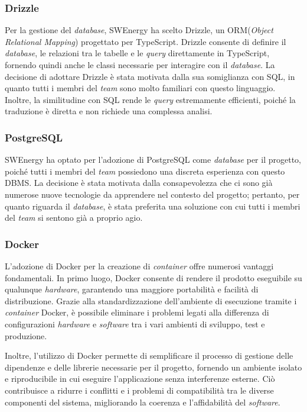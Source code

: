 \subsubsection{Drizzle}
Per la gestione del \textit{database}, SWEnergy ha scelto Drizzle, un ORM\g (\textit{Object
	Relational Mapping}) progettato per TypeScript. Drizzle consente di definire
il \textit{database}, le relazioni tra le tabelle e le \textit{query} direttamente in
TypeScript, fornendo quindi anche le classi necessarie per interagire con il
\textit{database}. La decisione di adottare Drizzle è stata motivata dalla sua
somiglianza con SQL, in quanto tutti i membri del \textit{team} sono molto familiari
con questo linguaggio. Inoltre, la similitudine con SQL rende le
\textit{query} estremamente efficienti, poiché la traduzione è diretta e non
richiede una complessa analisi.


\subsubsection{PostgreSQL}
SWEnergy ha optato per l'adozione di PostgreSQL come \textit{database} per il progetto,
poiché tutti i membri del \textit{team} possiedono una discreta esperienza con questo
DBMS. La decisione è stata motivata dalla consapevolezza che ci sono già
numerose nuove tecnologie da apprendere nel contesto del progetto; pertanto, per
quanto riguarda il \textit{database}, è stata preferita una soluzione con cui tutti i
membri del \textit{team} si sentono già a proprio agio.


\subsubsection{Docker}
L'adozione di Docker per la creazione di \textit{container} offre numerosi vantaggi fondamentali.
In primo luogo, Docker consente di rendere il prodotto eseguibile su qualunque \textit{hardware}, garantendo una maggiore portabilità e facilità di distribuzione.
Grazie alla standardizzazione dell'ambiente di esecuzione tramite i \textit{container} Docker, è possibile eliminare i problemi legati alla differenza di configurazioni \textit{hardware} e \textit{software} tra i vari ambienti di sviluppo, test e produzione.

Inoltre, l'utilizzo di Docker permette di semplificare il processo di gestione
delle dipendenze e delle librerie necessarie per il progetto, fornendo un
ambiente isolato e riproducibile in cui eseguire l'applicazione senza
interferenze esterne. Ciò contribuisce a ridurre i conflitti e i problemi di
compatibilità tra le diverse componenti del sistema, migliorando la coerenza e
l'affidabilità del \textit{software}.

